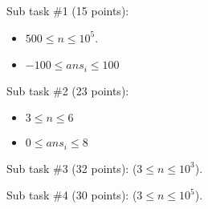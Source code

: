 Sub task \#1 (15 points):
\begin{itemize}
\item $500 \leq n \leq 10^5$.
\item $-100 \le ans_i \le 100$
\end{itemize}

Sub task \#2 (23 points): 
\begin{itemize}
\item $3 \leq n \leq 6$
\item $0 \le ans_i \le 8$
\end{itemize}

Sub task \#3 (32 points): ($3 \leq n \leq 10^3$).

Sub task \#4 (30 points): ($3 \leq n \leq 10^5$).